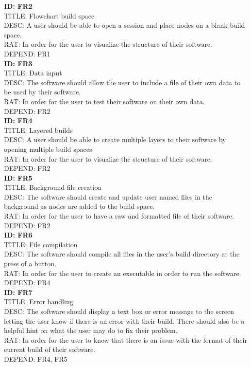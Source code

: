 \documentclass[a4paper,10pt]{article} \usepackage[margin=1.0in]{geometry} \usepackage{pdfpages} \usepackage{graphicx}
\begin{document}
\noindent
\textbf{ID: FR2}\\
TITLE: Flowchart build space\\
DESC: A user should be able to open a session and place nodes on a blank build space.\\
RAT: In order for the user to visualize the structure of their software.\\
DEPEND: FR1\\

\noindent
\textbf{ID: FR3}\\
TITLE: Data input\\
DESC: The software should allow the user to include a file of their own data to be used by their software.\\
RAT: In order for the user to test their software on their own data.\\
DEPEND: FR2\\


\noindent
\textbf{ID: FR4}\\
TITLE: Layered builds\\
DESC: A user should be able to create multiple layers to their software by opening multiple build spaces.\\
RAT: In order for the user to visualize the structure of their software.\\
DEPEND: FR2\\

\noindent
\textbf{ID: FR5}\\
TITLE: Background file creation\\
DESC: The software should create and update user named files in the background as nodes are added to the build space.\\
RAT: In order for the user to have a raw and formatted file of their software.\\
DEPEND: FR2\\

\noindent
\textbf{ID: FR6}\\
TITLE: File compilation\\
DESC: The software should compile all files in the user's build directory at the press of a button.\\
RAT: In order for the user to create an executable in order to run the software.\\
DEPEND: FR4\\

\noindent
\textbf{ID: FR7}\\
TITLE: Error handling\\
DESC: The software should display a text box or error message to the screen letting the user know if there is an error with their build. 
There should also be a helpful hint on what the user may do to fix their problem.\\
RAT: In order for the user to know that there is an issue with the format of their current build of their software.\\
DEPEND: FR4, FR5\\
\end{document}
